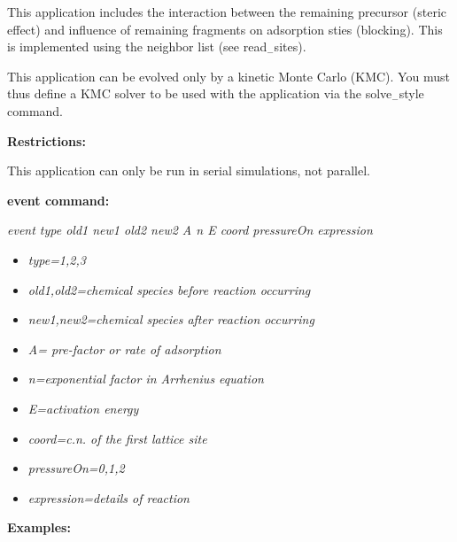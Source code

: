 \documentclass[a4paper,12pt]{report}
\begin{document}
This application includes the interaction between the remaining precursor (steric effect) and influence of remaining fragments on adsorption sties (blocking).
This is implemented using the neighbor list (see read$_-$sites).

This application can be evolved only by a kinetic Monte Carlo (KMC). You must thus define a KMC solver to be used with the application via the solve$_-$style command.
\newline

\textbf{Restrictions:}
\newline

This application can only be run in serial simulations, not parallel. 
\newline

\textbf{event command:}
\newline

\emph{event type old1 new1 old2 new2 A n E coord pressureOn expression}

\begin{itemize}

  \item \emph{type=1,2,3}
  \item \emph{old1,old2=chemical species before reaction occurring}
  \item \emph{new1,new2=chemical species after reaction occurring}
  \item \emph{A= pre-factor or rate of adsorption}
  \item \emph{n=exponential factor in Arrhenius equation}
  \item \emph{E=activation energy}
  \item \emph{coord=c.n. of the first lattice site} 
  \item \emph{pressureOn=0,1,2}
  \item \emph{expression=details of reaction}

\end{itemize}

\textbf{Examples:}
\newline
\end{document}
